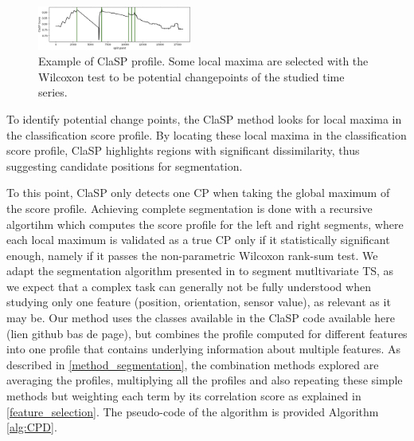 \documentclass[conference]{IEEEtran}
\begin{document}
\begin{figure}[ht]
  \centering
  \includegraphics[width=0.45\textwidth]{img/ClaspProfile.png}
  \caption{Example of ClaSP profile. Some local maxima are selected with the Wilcoxon test to be potential changepoints of the studied time series.}
  \label{fig:ClaSProfile}
\end{figure}

To identify potential change points, the ClaSP method looks for local maxima in the classification score profile. By locating these local maxima in the classification score profile, ClaSP highlights regions with significant dissimilarity, thus suggesting candidate positions for segmentation. 

To this point, ClaSP only detects one CP when taking the global maximum of the score profile. Achieving complete segmentation is done with a recursive algortihm which computes the score profile for the left and right segments, where each local maximum is validated as a true CP only if it statistically significant enough, namely if it passes the non-parametric Wilcoxon rank-sum test. We adapt the segmentation algorithm presented in \cite{clasp} to segment mutltivariate TS, as we expect that a complex task can generally not be fully understood when studying only one feature (position, orientation, sensor value), as relevant as it may be. Our method uses the classes available in the ClaSP code available here (lien github bas de page), but combines the profile computed for different features into one profile that contains underlying information about multiple features. As described in \ref{method_segmentation}, the combination methods explored are averaging the profiles, multiplying all the profiles and also repeating these simple methods but weighting each term by its correlation score as explained in \ref{feature_selection}. The pseudo-code of the algorithm is provided Algorithm \ref{alg:CPD}.
\end{document}
